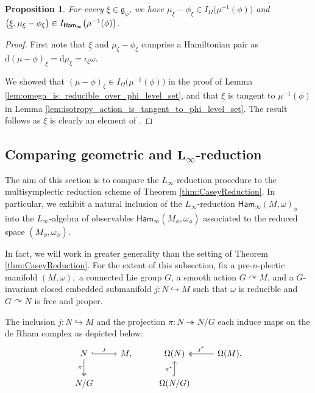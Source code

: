 \documentclass[10pt,a4paper]{amsart}
\numberwithin{equation}{section}
\newtheorem{Proposition}[Theorem]{Proposition}
 { \theoremstyle{definition}
\newtheorem{Definition}[Theorem]{Definition}
\newtheorem{Note}[Theorem]{Note}
\newtheorem{Example}[Theorem]{Example}
\newtheorem{Remark}[Theorem]{Remark} }
\newcommand{\g}{\mathfrak{g}}
\newcommand{\Ham}{\mathsf{Ham}}
\newcommand{\X}{\mathfrak{X}}
\renewcommand{\d}{\mathrm{d}}
\begin{document}
\begin{Proposition}%
	For every $\xi\in\g_\phi$, we have $\mu_\xi-\phi_\xi\in I_{\Omega}\bigl(\mu^{-1}(\phi)\bigr)$ and $\bigl(\underline\xi,\mu_\xi-\phi_\xi\bigr)\in \smash{I_{\Ham_\infty}\bigl(\mu^{-1}(\phi)\bigr)}$.
\end{Proposition}

\begin{proof}
	First note that $\underline\xi$ and $\mu_\xi-\phi_\xi$ comprise a Hamiltonian pair as $\d(\mu-\phi)_\xi = \d\mu_\xi = \iota_\xi\omega$.

	We showed that $(\mu-\phi)_\xi\in I_\Omega\bigl(\mu^{-1}(\phi)\bigr)$ in the proof of Lemma \ref{lem:omega_is_reducible_over_phi_level_set}, and that $\underline\xi$ is tangent to $\mu^{-1}(\phi)$ in Lemma \ref{lem:isotropy_action_is_tangent_to_phi_level_set}. The result follows as $\underline\xi$ is clearly an element of \smash{$\X_\g(M)+I_\X\bigl(\mu^{-1}(\phi)\bigr)$}.
\end{proof}


\subsection[Comparing geometric and L\_infty-reduction]{Comparing geometric and $\boldsymbol{L_\infty}$-reduction}%

The aim of this section is to compare the $L_\infty$-reduction procedure to the multisymplectic reduction scheme of Theorem \ref{thm:CaseyReduction}. In particular, we exhibit a natural inclusion of the $L_\infty$-reduction $\Ham_\infty(M,\omega)_\phi$ into the $L_\infty$-algebra of observables $\Ham_\infty(M_\phi,\omega_\phi)$ associated to the reduced space $(M_\phi,\omega_\phi)$.

In fact, we will work in greater generality than the setting of Theorem \ref{thm:CaseyReduction}. For the extent of this subsection, fix a pre-$n$-plectic manifold $(M,\omega),$ a connected Lie group $G$, a smooth action $G\curvearrowright M$, and a $G$-invariant closed embedded submanifold $j\colon N\hookrightarrow M$ such that $\omega$ is reducible and $G\curvearrowright N$ is free and proper.

The inclusion $j\colon N\hookrightarrow M$ and the projection $\pi\colon N\twoheadrightarrow N/G$ each induce maps on the de Rham complex as depicted below:
\[
	\begin{tikzcd}
		N \ar[r,hook,"j"] \ar[d,two heads,"\pi"'] & M,  & \Omega(N) & \Omega(M). \ar[l,two heads,"j^\ast"']
		\\
		N/G &   & \Omega(N/G) \ar[u,hook,"\pi^\ast"]
	\end{tikzcd}
\]
\end{document}
